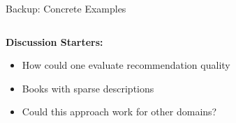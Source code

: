 \begin{frame}{Backup: Concrete Examples}
\begin{columns}[T]
\begin{column}{0.45\textwidth}
    \vspace{0.1cm}
    \textbf{Discussion Starters:}
    \begin{itemize}
      \item  How could one evaluate recommendation quality
      \item  Books with sparse descriptions
      \item  Could this approach work for other domains?
    \end{itemize}
  \end{column}
\end{columns}

\end{frame}